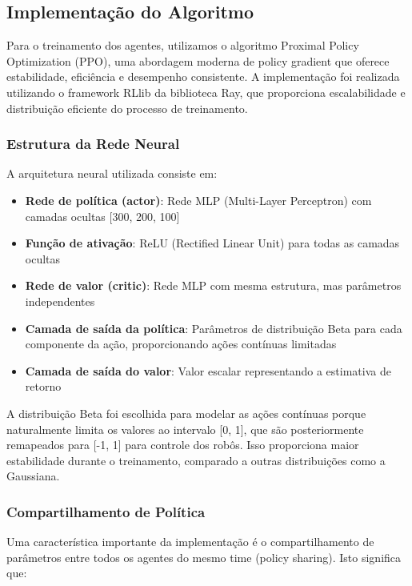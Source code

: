 \subsection{Implementação do Algoritmo}

Para o treinamento dos agentes, utilizamos o algoritmo Proximal Policy Optimization (PPO), uma abordagem moderna de policy gradient que oferece estabilidade, eficiência e desempenho consistente. A implementação foi realizada utilizando o framework RLlib da biblioteca Ray, que proporciona escalabilidade e distribuição eficiente do processo de treinamento.

\subsubsection{Estrutura da Rede Neural}

A arquitetura neural utilizada consiste em:

\begin{itemize}
    \item \textbf{Rede de política (actor)}: Rede MLP (Multi-Layer Perceptron) com camadas ocultas [300, 200, 100]
    \item \textbf{Função de ativação}: ReLU (Rectified Linear Unit) para todas as camadas ocultas
    \item \textbf{Rede de valor (critic)}: Rede MLP com mesma estrutura, mas parâmetros independentes
    \item \textbf{Camada de saída da política}: Parâmetros de distribuição Beta para cada componente da ação, proporcionando ações contínuas limitadas
    \item \textbf{Camada de saída do valor}: Valor escalar representando a estimativa de retorno
\end{itemize}

A distribuição Beta foi escolhida para modelar as ações contínuas porque naturalmente limita os valores ao intervalo [0, 1], que são posteriormente remapeados para [-1, 1] para controle dos robôs. Isso proporciona maior estabilidade durante o treinamento, comparado a outras distribuições como a Gaussiana.

\subsubsection{Compartilhamento de Política}

Uma característica importante da implementação é o compartilhamento de parâmetros entre todos os agentes do mesmo time (policy sharing). Isto significa que:


